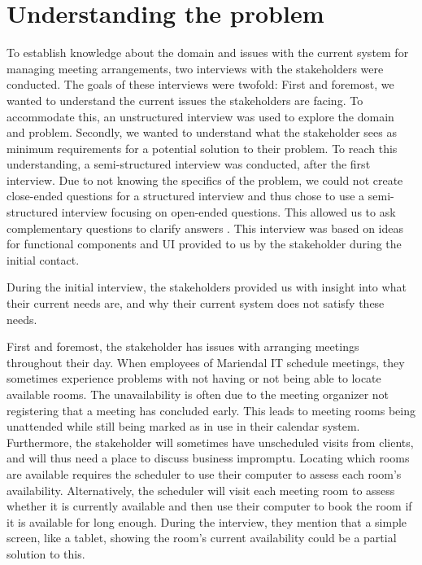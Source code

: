\section{Understanding the problem}\label{sec:understanding_the_problem} %
To establish knowledge about the domain and issues with the current system for managing meeting arrangements, two interviews with the stakeholders were conducted. 
The goals of these interviews were twofold: 
First and foremost, we wanted to understand the current issues the stakeholders are facing. 
To accommodate this, an unstructured interview was used to explore the domain and problem\cite{robson2002real}.
Secondly, we wanted to understand what the stakeholder sees as minimum requirements for a potential solution to their problem. 
To reach this understanding, a semi-structured interview was conducted, after the first interview. 
Due to not knowing the specifics of the problem, we could not create close-ended questions for a structured interview and thus chose to use a semi-structured interview focusing on open-ended questions. This allowed us to ask complementary questions to clarify answers \cite{InterviewsNHS}.
This interview was based on ideas for functional components and UI provided to us by the stakeholder during the initial contact.


During the initial interview, the stakeholders provided us with insight into what their current needs are, and why their current system does not satisfy these needs.

First and foremost, the stakeholder has issues with arranging meetings throughout their day.
When employees of Mariendal IT schedule meetings, they sometimes experience problems with not having or not being able to locate available rooms.
The unavailability is often due to the meeting organizer not registering that a meeting has concluded early.
This leads to meeting rooms being unattended while still being marked as in use in their calendar system.
Furthermore, the stakeholder will sometimes have unscheduled visits from clients, and will thus need a place to discuss business impromptu. 
Locating which rooms are available requires the scheduler to use their computer to assess each room's availability.
Alternatively, the scheduler will visit each meeting room to assess whether it is currently available and then use their computer to book the room if it is available for long enough.
During the interview, they mention that a simple screen, like a tablet, showing the room's current availability could be a partial solution to this.

